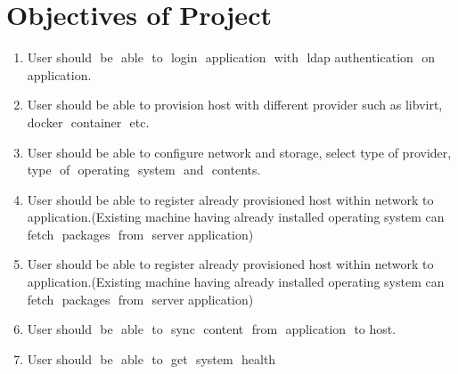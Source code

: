 \documentclass[a4paper,12pt]{report}
\begin{document}
\chapter{Objectives of Project}
\begin{enumerate}
	\item User should​ ​ be​ ​ able​ ​ to​ ​ login​ ​ application​ ​ with​ ​ ldap​ ​ authentication​ ​ on​ ​ application.
	\item User should be able to provision host with different provider such as libvirt,	docker​ ​ container​ ​ etc.
	\item User should be able to configure network and storage, select type of provider,
	type​ ​ of​ ​ operating​ ​ system​ ​ and​ ​ contents.
	\item User should be able to register already provisioned host within network to
	application.(Existing machine having already installed operating system can
	fetch​ ​ packages​ ​ from​ ​ server​ ​ application)
	\item User should be able to register already provisioned host within network to
	application.(Existing machine having already installed operating system can
	fetch​ ​ packages​ ​ from​ ​ server​ ​ application)
	\item User should​ ​ be​ ​ able​ ​ to​ ​ sync​ ​ content​ ​ from​ ​ application​ ​ to​ ​ host.
	\item User should​ ​ be​ ​ able​ ​ to​ ​ get​ ​ system​ ​ health
	
\end{enumerate}
\end{document}
